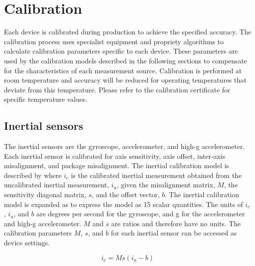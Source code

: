 \section{Calibration}
\label{sec:calibration}

Each device is calibrated during production to achieve the specified accuracy.  The calibration process uses specialist equipment and propriety algorithms to calculate calibration parameters specific to each device.  These parameters are used by the calibration models described in the following sections to compensate for the characteristics of each measurement source.  Calibration is performed at room temperature and accuracy will be reduced for operating temperatures that deviate from this temperature.  Please refer to the calibration certificate for specific temperature values.

\subsection{Inertial sensors}
\label{sec:inertialSensor}

The inertial sensors are the gyroscope, accelerometer, and high-g accelerometer.  Each inertial sensor is calibrated for axis sensitivity, axis offset, inter-axis misalignment, and package misalignment.  The inertial calibration model is described by  where $i_c$ is the calibrated inertial measurement obtained from the uncalibrated inertial measurement, $i_u$, given the misalignment matrix, $M$, the sensitivity diagonal matrix, $s$, and the offset vector, $b$.  The inertial calibration model is expanded as  to express the model as 15 scalar quantities.  The units of $i_c$, $i_u$, and $b$ are degrees per second for the gyroscope, and g for the accelerometer and high-g accelerometer.  $M$ and $s$ are ratios and therefore have no units.  The calibration parameters $M$, $s$, and $b$ for each inertial sensor can be accessed as device settings.

\begin{equation}
\label{eq:inertial}
i_c = M s (i_u - b)
\end{equation}

